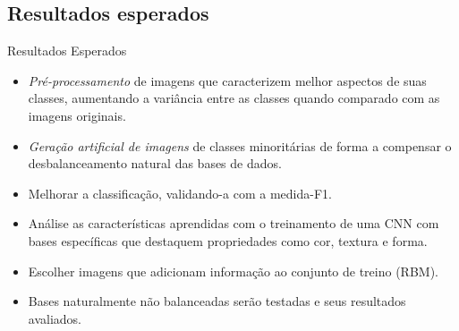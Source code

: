\documentclass{beamer}
\begin{document}
\subsection{Resultados esperados}
\begin{frame}{Resultados Esperados}

\begin{itemize}
\item \textit{Pré-processamento} de imagens que caracterizem melhor aspectos de suas classes, aumentando a variância entre as classes quando comparado com as imagens originais.
\item \textit{Geração artificial de imagens} de classes minoritárias de forma a compensar o desbalanceamento natural das bases de dados.
\item Melhorar a classificação, validando-a com a medida-F1. 
\item Análise as características aprendidas com o treinamento de uma CNN com bases específicas que destaquem propriedades como cor, textura e forma. 
\item Escolher imagens que adicionam informação ao conjunto de treino (RBM).
\item Bases naturalmente não balanceadas serão testadas e seus resultados avaliados.
\end{itemize}




\end{frame}
\end{document}
